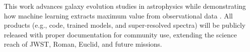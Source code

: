 \documentclass[12pt]{article}
\begin{document}
This work advances galaxy evolution studies in astrophysics while demonstrating how machine learning extracts maximum value from observational data \citep{schawinski2017, fabbro2018}. All products (e.g., code, trained models, and super-resolved spectra) will be publicly released with proper documentation for community use, extending the science reach of JWST, Roman, Euclid, and future missions.


\end{document}
